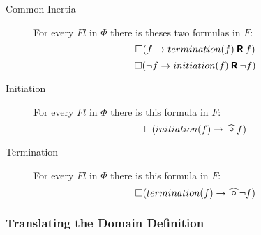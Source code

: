 \begin{description}
  \item[Common Inertia]
  For every $Fl$ in $\Phi$ there is theses two formulas in $F$:
  $$\square(f\rightarrow termination(f) \mathbin{\bm{\mathsf{R}}} f)$$
  $$\square(\neg f\rightarrow initiation(f) \mathbin{\bm{\mathsf{R}}} \neg f)$$
  \item[Initiation]
  For every $Fl$ in $\Phi$ there is this formula in $F$:
  $$\alwaysF(initiation(f)\rightarrow\wnext f)$$
  \item[Termination]
  For every $Fl$ in $\Phi$ there is this formula in $F$:
  $$\alwaysF(termination(f)\rightarrow\wnext \neg f)$$
\end{description}

\subsubsection{Translating the Domain Definition}

